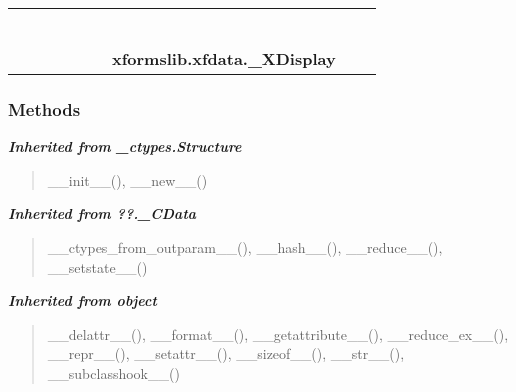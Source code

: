     \label{xformslib:xfdata:_XDisplay}
\begin{tabular}{cccccccccc}
\multicolumn{2}{r}{\settowidth{\BCL}{object}\multirow{2}{\BCL}{object}}
&&
&&
&&
  \\\cline{3-3}
  &&\multicolumn{1}{c|}{}
&&
&&
&&
  \\
\multicolumn{4}{r}{\settowidth{\BCL}{??.\_CData}\multirow{2}{\BCL}{??.\_CData}}
&&
&&
  \\\cline{5-5}
  &&&&\multicolumn{1}{c|}{}
&&
&&
  \\
\multicolumn{6}{r}{\settowidth{\BCL}{\_ctypes.Structure}\multirow{2}{\BCL}{\_ctypes.Structure}}
&&
  \\\cline{7-7}
  &&&&&&\multicolumn{1}{c|}{}
&&
  \\
&&&&&&\multicolumn{2}{l}{\textbf{xformslib.xfdata.\_XDisplay}}
\end{tabular}



  \subsubsection{Methods}


\large{\textbf{\textit{Inherited from \_ctypes.Structure}}}

\begin{quote}
\_\_init\_\_(), \_\_new\_\_()
\end{quote}

\large{\textbf{\textit{Inherited from ??.\_CData}}}

\begin{quote}
\_\_ctypes\_from\_outparam\_\_(), \_\_hash\_\_(), \_\_reduce\_\_(), \_\_setstate\_\_()
\end{quote}

\large{\textbf{\textit{Inherited from object}}}

\begin{quote}
\_\_delattr\_\_(), \_\_format\_\_(), \_\_getattribute\_\_(), \_\_reduce\_ex\_\_(), \_\_repr\_\_(), \_\_setattr\_\_(), \_\_sizeof\_\_(), \_\_str\_\_(), \_\_subclasshook\_\_()
\end{quote}


